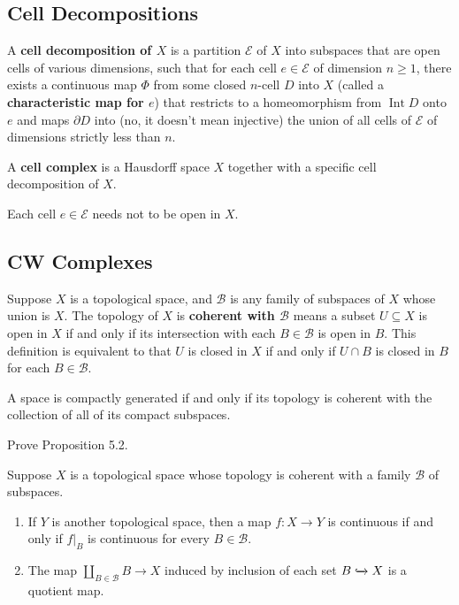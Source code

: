 \subsection*{Cell Decompositions}

A \textbf{cell decomposition of \( X \)} is a partition \( \mathscr{E} \) of \( X \) into subspaces that are open cells of various dimensions, such that for each cell \( e \in \mathscr{E} \) of dimension \( n\geq 1 \), there exists a continuous map \( \Phi \) from some closed \( n \)-cell \( D \) into \( X \) (called a \textbf{characteristic map for \( e \)}) that restricts to a homeomorphism from \( \operatorname{Int} D \) onto \( e \) and maps \( \partial D \) into (no, it doesn't mean injective) the union of all cells of \( \mathscr{E} \) of dimensions strictly less than \( n \).

A \textbf{cell complex} is a Hausdorff space \( X \) together with a specific cell decomposition of \( X \).

Each cell \( e \in \mathscr{E} \) needs not to be open in \( X \).

\subsection*{CW Complexes}

Suppose \( X \) is a topological space, and \( \mathscr{B} \) is any family of subspaces of \( X \) whose union is \( X \). The topology of \( X \) is \textbf{coherent with \( \mathscr{B} \)} means a subset \( U \subseteq X \) is open in \( X \) if and only if its intersection with each \( B\in\mathscr{B} \) is open in \( B \). This definition is equivalent to that \( U \) is closed in \( X \) if and only if \( U\cap B \) is closed in \( B \) for each \( B \in \mathscr{B} \).

A space is compactly generated if and only if its topology is coherent with the collection of all of its compact subspaces.

\begin{exercise}{5.3}\label{exercise:5.3}
	Prove Proposition 5.2.

	Suppose \( X \) is a topological space whose topology is coherent with a family \( \mathscr{B} \) of subspaces.
	\begin{enumerate}[label={(\alph*)}]
		\item If \( Y \) is another topological space, then a map \( f: X\to Y \) is continuous if and only if \( f\vert_{B} \) is continuous for every \( B\in \mathscr{B} \).
		\item The map \( \coprod_{B\in\mathscr{B}}B \to X \) induced by inclusion of each set \( B\xhookrightarrow{} X \) is a quotient map.
	\end{enumerate}
\end{exercise}

